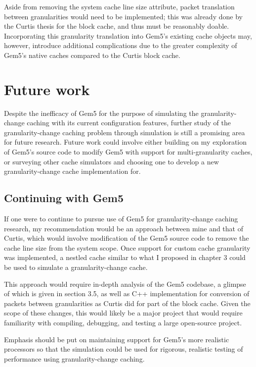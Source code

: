 \documentclass[12pt,twoside]{reedthesis}
\begin{document}
	Aside from removing the system cache line size attribute, packet translation between granularities would need to be implemented; this was already done by the Curtis thesis for the block cache, and thus must be reasonably doable. Incorporating this granularity translation into Gem5's existing cache objects may, however, introduce additional complications due to the greater complexity of Gem5's native caches compared to the Curtis block cache.

\section{Future work}

	Despite the inefficacy of Gem5 for the purpose of simulating the granularity-change caching with its current configuration features, further study of the granularity-change caching problem through simulation is still a promising area for future research. Future work could involve either building on my exploration of Gem5's source code to modify Gem5 with support for multi-granularity caches, or surveying other cache simulators and choosing one to develop a new granularity-change cache implementation for.

	\subsection*{Continuing with Gem5}

	If one were to continue to pursue use of Gem5 for granularity-change caching research, my recommendation would be an approach between mine and that of Curtis, which would involve modification of the Gem5 source code to remove the cache line size from the system scope. Once support for custom cache granularity was implemented, a nestled cache similar to what I proposed in chapter 3 could be used to simulate a granularity-change cache.
	
	This approach would require in-depth analysis of the Gem5 codebase, a glimpse of which is given in section 3.5, as well as C++ implementation for conversion of packets between granularities as Curtis did for part of the block cache. Given the scope of these changes, this would likely be a major project that would require familiarity with compiling, debugging, and testing a large open-source project.

	Emphasis should be put on maintaining support for Gem5's more realistic processors so that the simulation could be used for rigorous, realistic testing of performance using granularity-change caching.
\end{document}
